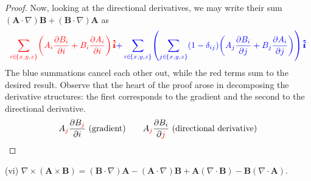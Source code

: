 \documentclass[a4paper]{article}
\begin{document}
\begin{proof}[Proof]
Now, looking at the directional derivatives, we may write their sum \( \!\left( \pmb{A} \cdot \nabla \right)\pmb{B} + \!\left( \pmb{B} \cdot \nabla \right)\pmb{A} \) as 
\[
	\textcolor{red}{\sum_{i \in \!\left\{ x,y,z \right\}} \!\left( A_{i}\frac{\partial B_{i}}{\partial i} + B_{i}\frac{\partial A_{i}}{\partial i} \right)\pmb{\hat{i}}} \textcolor{blue}{+ \sum_{i \in \!\left\{ x,y,z \right\}} \!\left( \sum_{j \in \!\left\{ x,y,z \right\}} \!\left( 1 - \delta_{ij} \right)\!\left( A_{j}\frac{\partial B_{i}}{\partial j} + B_{j}\frac{\partial A_{i}}{\partial j} \right) \right) \pmb{\hat{i}}}
\]
The blue summations cancel each other out, while the red terms sum to the desired result. Observe that the heart of the proof arose in decomposing the derivative structures: the first corresponds to the gradient and the second to the directional derivative.
\[
	A_{\textcolor{red}{j}}\frac{\partial B_{\textcolor{red}{j}}}{\partial i} \text{ (gradient)} \qquad A_{\textcolor{red}{j}}\frac{\partial B_{i}}{\partial \textcolor{red}{j}} \text{ (directional derivative)}
\]
\end{proof}

(vi) \( \nabla \times \!\left( \pmb{A} \times \pmb{B} \right) = \!\left( \pmb{B} \cdot \nabla \right)\pmb{A} - \!\left( \pmb{A} \cdot \nabla \right)\pmb{B} + \pmb{A}\!\left( \nabla \cdot \pmb{B} \right) - \pmb{B}\!\left( \nabla \cdot \pmb{A} \right) \).
\end{document}
